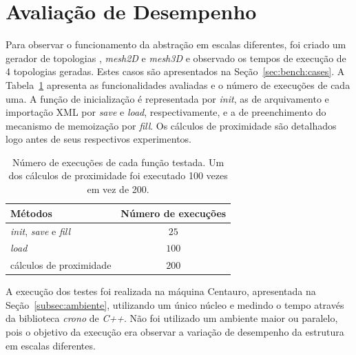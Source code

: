 
\section{Avaliação de Desempenho}
\label{sec:bench}

Para observar o funcionamento da abstração em escalas diferentes, foi criado um gerador de topologias \fatt, \textit{mesh2D} e \textit{mesh3D} e observado os tempos de execução de 4 topologias geradas. 
Estes casos são apresentados na Seção~\ref{sec:bench:cases}.
A Tabela~\ref{tab:sizes_bench} apresenta as funcionalidades avaliadas e o número de execuções de cada uma. 
A função de inicialização é representada por \textit{init}, as de arquivamento e importação XML por \textit{save} e \textit{load}, respectivamente, e a de preenchimento do mecanismo de memoização por \textit{fill}.
Os cálculos de proximidade são detalhados logo antes de seus respectivos experimentos.

\setlength{\tabcolsep}{0.5em}
\begin{table}[!ht]
    \centering
    \begin{tabular}{l c}
        \toprule
        \textbf{Métodos} &    \textbf{Número de execuções} \\ \midrule
        \textit{init}, \textit{save} e \textit{fill} & $25$   \\ %
        \textit{load} & $100$   \\ %
        cálculos de proximidade & $200$ \\ \bottomrule
    \end{tabular}
    \caption[Número de execuções de cada função.]{Número de execuções de cada função testada. Um dos cálculos de proximidade foi executado 100 vezes em vez de 200.}
    \label{tab:sizes_bench}
\end{table}

A execução dos testes foi realizada na máquina Centauro, apresentada na Seção~\ref{subsec:ambiente}, utilizando um único núcleo e medindo o tempo através da biblioteca \textit{crono} de \textit{C++}.
Não foi utilizado um ambiente maior ou paralelo, pois o objetivo da execução era observar a variação de desempenho da estrutura em escalas diferentes.



